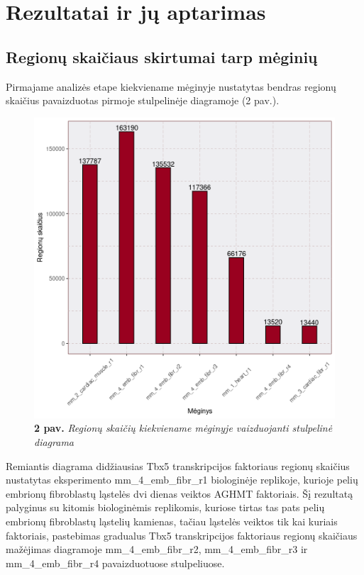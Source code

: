 \documentclass[12pt]{article}
\begin{document}
\newpage



\section{Rezultatai ir jų aptarimas}
\subsection{Regionų skaičiaus skirtumai tarp mėginių}
Pirmajame analizės etape kiekviename mėginyje nustatytas bendras regionų
skaičius pavaizduotas pirmoje stulpelinėje diagramoje (2 pav.).

\begin{figure}[htb]
    \begin{center}
        \includegraphics[width=0.7\linewidth]{../Figures/total_peak_counts.png}
        \caption*{\textbf{2 pav.} \emph{Regionų skaičių kiekviename mėginyje
                                        vaizduojanti stulpelinė diagrama}}
    \end{center}
\end{figure}

Remiantis diagrama didžiausias Tbx5 transkripcijos faktoriaus regionų skaičius
nustatytas eksperimento mm\_4\_emb\_fibr\_r1 biologinėje replikoje, kurioje
pelių embrionų fibroblastų ląstelės dvi dienas veiktos AGHMT faktoriais. Šį
rezultatą palyginus su kitomis biologinėmis replikomis, kuriose tirtas tas pats
pelių embrionų fibroblastų ląstelių kamienas, tačiau ląstelės veiktos tik kai
kuriais faktoriais, pastebimas gradualus Tbx5 transkripcijos faktoriaus regionų
skaičiaus mažėjimas diagramoje mm\_4\_emb\_fibr\_r2, mm\_4\_emb\_fibr\_r3 ir
mm\_4\_emb\_fibr\_r4 pavaizduotuose stulpeliuose.
\end{document}
